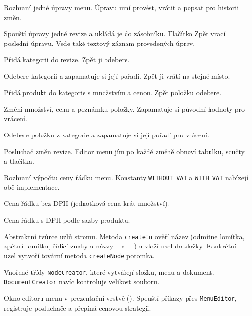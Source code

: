 \begin{description}[itemsep=2pt,style=unboxed]
  \item[\texttt{MenuEditCommand}] Rozhraní jedné úpravy menu. Úpravu umí provést, vrátit a popsat pro historii změn.
  \item[\texttt{MenuEditor}] Spouští úpravy jedné revize a ukládá je do zásobníku. Tlačítko Zpět vrací poslední úpravu. Vede také textový záznam provedených úprav.
  \item[\texttt{AddCategoryCommand}] Přidá kategorii do revize. Zpět ji odebere.
  \item[\texttt{RemoveCategoryCommand}] Odebere kategorii a zapamatuje si její pořadí. Zpět ji vrátí na stejné místo.
  \item[\texttt{AddItemCommand}] Přidá produkt do kategorie s množstvím a cenou. Zpět položku odebere.
  \item[\texttt{ChangeItemCommand}] Změní množství, cenu a poznámku položky. Zapamatuje si původní hodnoty pro vrácení.
  \item[\texttt{RemoveItemCommand}] Odebere položku z kategorie a zapamatuje si její pořadí pro vrácení.
  \item[\texttt{MenuRevisionListener}] Posluchač změn revize. Editor menu jím po každé změně obnoví tabulku, součty a tlačítka.
  \item[\texttt{PriceStrategy}] Rozhraní výpočtu ceny řádku menu. Konstanty \texttt{WITHOUT\_VAT} a \texttt{WITH\_VAT} nabízejí obě implementace.
  \item[\texttt{PriceWithoutVat}] Cena řádku bez DPH (jednotková cena krát množství).
  \item[\texttt{PriceWithVat}] Cena řádku s DPH podle sazby produktu.
  \item[\texttt{NodeCreator}] Abstraktní tvůrce uzlů stromu. Metoda \texttt{createIn} ověří název (odmítne lomítka, zpětná lomítka, řídicí znaky a názvy \texttt{.} a \texttt{..}) a vloží uzel do složky. Konkrétní uzel vytvoří tovární metoda \texttt{createNode} potomka.
  \item[\texttt{FolderCreator}, \texttt{MenuCreator}, \texttt{DocumentCreator}] Vnořené třídy \texttt{NodeCreator}, které vytvářejí složku, menu a dokument. \texttt{DocumentCreator} navíc kontroluje velikost souboru.
  \item[\texttt{MenuEditorWindow}] Okno editoru menu v prezentační vrstvě (). Spouští příkazy přes \texttt{MenuEditor}, registruje posluchače a přepíná cenovou strategii.
\end{description}


